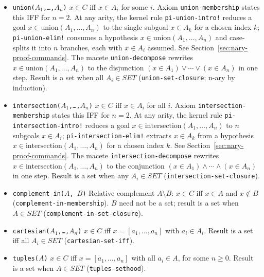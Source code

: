 \begin{itemize}

\item \texttt{union($A_1$,\ldots,$A_n$)}
  $x \in C$ iff $x \in A_i$ for some $i$.
  Axiom \texttt{union-membership} states this IFF for $n=2$.
  At any arity, the kernel rule \texttt{pi-union-intro!} reduces a goal
  $x \in \text{union}(A_1,\ldots,A_n)$ to the single subgoal $x \in A_k$
  for a chosen index $k$; \texttt{pi-union-elim!} consumes a hypothesis
  $x \in \text{union}(A_1,\ldots,A_n)$ and case-splits it into $n$
  branches, each with $x \in A_i$ assumed.  See
  Section~\ref{sec:nary-proof-commands}.
  The macete \texttt{union-decompose} rewrites
  $x \in \text{union}(A_1,\ldots,A_n)$ to the disjunction
  $(x \in A_1) \lor \cdots \lor (x \in A_n)$ in one step.
  Result is a set when all $A_i \in \mathit{SET}$
  (\texttt{union-set-closure}; n-ary by induction).

\item \texttt{intersection($A_1$,\ldots,$A_n$)}
  $x \in C$ iff $x \in A_i$ for all $i$.
  Axiom \texttt{intersection-membership} states this IFF for $n=2$.
  At any arity, the kernel rule \texttt{pi-intersection-intro!} reduces
  a goal $x \in \text{intersection}(A_1,\ldots,A_n)$ to $n$ subgoals
  $x \in A_i$; \texttt{pi-intersection-elim!} extracts $x \in A_k$ from
  a hypothesis $x \in \text{intersection}(A_1,\ldots,A_n)$ for a chosen
  index $k$.  See Section~\ref{sec:nary-proof-commands}.
  The macete \texttt{intersection-decompose} rewrites
  $x \in \text{intersection}(A_1,\ldots,A_n)$ to the conjunction
  $(x \in A_1) \land \cdots \land (x \in A_n)$ in one step.
  Result is a set when any $A_i \in \mathit{SET}$
  (\texttt{intersection-set-closure}).

\item \texttt{complement-in($A$, $B$)}
  Relative complement $A \setminus B$: $x \in C$ iff $x \in A$ and
  $x \notin B$ (\texttt{complement-in-membership}).
  $B$ need not be a set; result is a set when $A \in \mathit{SET}$
  (\texttt{complement-in-set-closure}).

\item \texttt{cartesian($A_1$,\ldots,$A_n$)}
  $x \in C$ iff $x = [a_1,\ldots,a_n]$ with $a_i \in A_i$.
  Result is a set iff all $A_i \in \mathit{SET}$ (\texttt{cartesian-set-iff}).

\item \texttt{tuples($A$)}
  $x \in C$ iff $x = [a_1,\ldots,a_n]$ with all $a_i \in A$,
  for some $n \ge 0$.
  Result is a set when $A \in \mathit{SET}$ (\texttt{tuples-sethood}).


\end{itemize}
